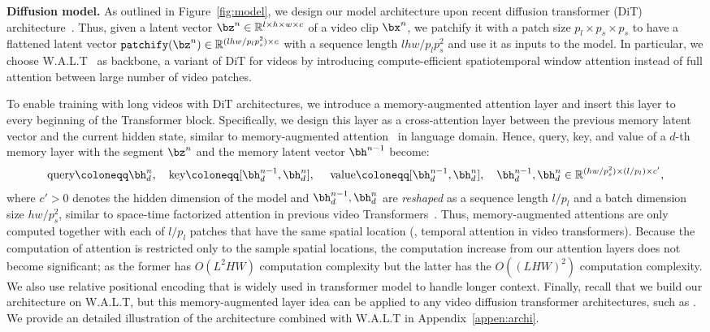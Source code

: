 \textbf{Diffusion model.}
As outlined in Figure~\ref{fig:model}, we design our model architecture upon recent diffusion transformer (DiT) architecture~\citep{Peebles2022DiT}. Thus, given a latent vector $\bz^n \in \mathbb{R}^{l \times h \times w \times c}$ of a video clip $\bx^n$, we patchify it with a patch size $p_l \times p_s \times p_s$ to have a flattened latent vector $\mathtt{patchify}(\bz^n) \in \mathbb{R}^{(lhw / p_lp_s^2) \times c}$ with a sequence length $lhw / p_lp_s^2$ and use it as inputs to the model. In particular, we choose W.A.L.T~\citep{gupta2023photorealistic} as backbone, a variant of DiT for videos by introducing compute-efficient spatiotemporal window attention instead of full attention between large number of video patches.

To enable training with long videos with DiT architectures, we introduce a memory-augmented attention layer and insert this layer to every beginning of the Transformer block. Specifically, we design this layer as a cross-attention layer between the previous memory latent vector and the current hidden state, similar to memory-augmented attention~\citep{dai2019transformer} in language domain. Hence, query, key, and value of a $d$-th memory layer with the segment $\bz^{n}$ and the memory latent vector $\bh^{n-1}$ become:
\begin{align*}
    \text{query}\coloneqq \bh_{d}^{n},\quad\text{key} \coloneqq [\bh_{d}^{n-1}, \bh_{d}^{n}],\quad \,\,\text{value}\coloneqq [\bh_{d}^{n-1}, \bh_{d}^{n}], \quad \bh_{d}^{n-1}, \bh_{d}^{n} \in \mathbb{R}^{(hw / p_s^2) \times (l/p_l) \times c'},
\end{align*}
where $c'>0$ denotes the hidden dimension of the model and $\bh_{d}^{n-1}, \bh_{d}^{n}$ are \emph{reshaped} as a sequence length $l/p_l$ and a batch dimension size $hw/p_s^2$, similar to space-time factorized attention in previous video Transformers~\citep{arnab2021vivit,bertasius2021space}. Thus, memory-augmented attentions are only computed together with each of $l/p_l$ patches that have the same spatial location (\ie, temporal attention in video transformers). Because the computation of attention is restricted only to the sample spatial locations, the computation increase from our attention layers does not become significant; as the former has $O(L^2HW)$ computation complexity but the latter has the $O((LHW)^2)$ computation complexity.
We also use relative positional encoding that is widely used in transformer model to handle longer context.
Finally, recall that we build our architecture on W.A.L.T, but this memory-augmented layer idea can be applied to any video diffusion transformer architectures, such as \citep{lu2023vdt,ma2024latte}. We provide an detailed illustration of the architecture combined with W.A.L.T in Appendix~\ref{appen:archi}.